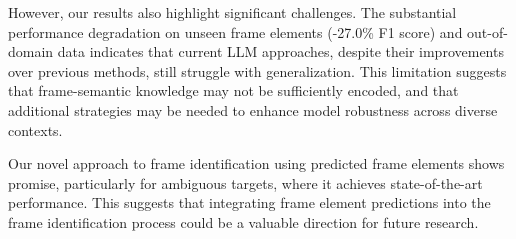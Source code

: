 However, our results also highlight significant challenges. The substantial performance degradation on unseen frame elements (-27.0\% F1 score) and out-of-domain data indicates that current LLM approaches, despite their improvements over previous methods, still struggle with generalization. This limitation suggests that frame-semantic knowledge may not be sufficiently encoded, and that additional strategies may be needed to enhance model robustness across diverse contexts.

Our novel approach to frame identification using predicted frame elements shows promise, particularly for ambiguous targets, where it achieves state-of-the-art performance. This suggests that integrating frame element predictions into the frame identification process could be a valuable direction for future research.



